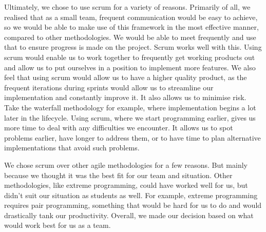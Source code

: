             Ultimately, we chose to use scrum for a variety of reasons.
            Primarily of all, we realised that as a small team, frequent communication would be easy to achieve, so we
            would be able to make use of this framework in the most effective manner, compared to other methodologies.
            We would be able to meet frequently and use that to ensure progress is made on the project. Scrum works well
            with this. Using scrum would enable us to work together to frequently get working products out and allow us
            to put ourselves in a position to implement more features. We also feel that using scrum would allow us to
            have a higher quality product, as the frequent iterations during sprints would allow us to streamline our
            implementation and constantly improve it. It also allows us to minimise risk. Take the waterfall methodology
            for example, where implementation begins a lot later in the lifecycle. Using scrum, where we start
            programming earlier, gives us more time to deal with any difficulties we encounter. It allows us to spot
            problems earlier, have longer to address them, or to have time to plan alternative implementations that
            avoid such problems. 
            
            We chose scrum over other agile methodologies for a few reasons. But mainly because we
            thought it was the best fit for our team and situation. Other methodologies, like extreme programming, could
            have worked well for us, but didn’t suit our situation as students as well. For example, extreme programming
            requires pair programming, something that would be hard for us to do and would drastically tank our
            productivity. Overall, we made our decision based on what would work best for us as a team.

    
